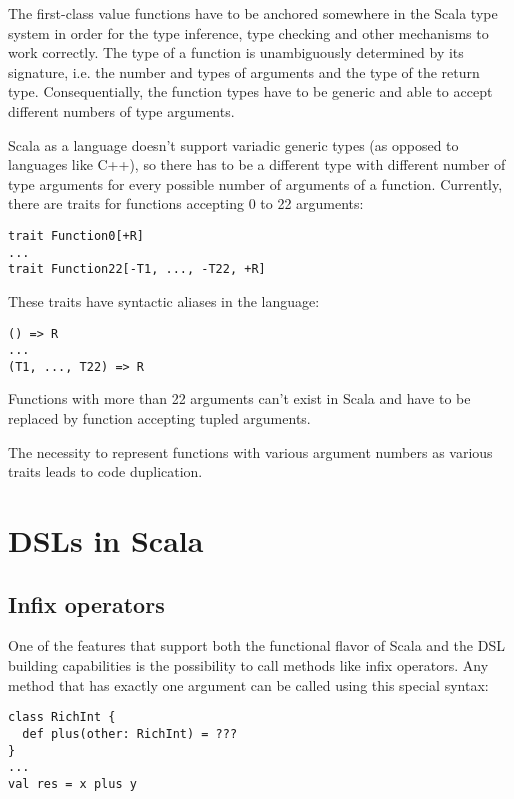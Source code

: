 The first-class value functions have to be anchored somewhere in the Scala type system in order for the type inference, type checking and other mechanisms to work correctly. The type of a function is unambiguously determined by its signature, i.e. the number and types of arguments and the type of the return type. Consequentially, the function types have to be generic and able to accept different numbers of type arguments.

Scala as a language doesn't support variadic generic types (as opposed to languages like C++), so there has to be a different type with different number of type arguments for every possible number of arguments of a function. Currently, there are traits for functions accepting 0 to 22 arguments:

\lstset{style=Scala}
\begin{lstlisting}
trait Function0[+R]
...
trait Function22[-T1, ..., -T22, +R]
\end{lstlisting}

These traits have syntactic aliases in the language:

\lstset{style=Scala}
\begin{lstlisting}
() => R
...
(T1, ..., T22) => R
\end{lstlisting}

Functions with more than 22 arguments can't exist in Scala and have to be replaced by function accepting tupled arguments.

The necessity to represent functions with various argument numbers as various traits leads to code duplication.

\section{DSLs in Scala}

\subsection{Infix operators}
\label{subsec:infixops}

One of the features that support both the functional flavor of Scala and the DSL building capabilities is the possibility to call methods like infix operators. Any method that has exactly one argument can be called using this special syntax:

\lstset{style=Scala}
\begin{lstlisting}
class RichInt {
  def plus(other: RichInt) = ???
}
...
val res = x plus y
\end{lstlisting}


